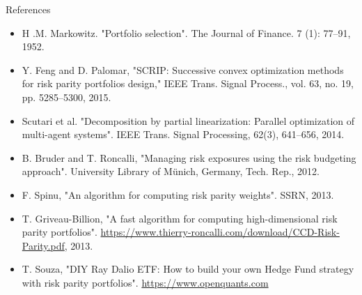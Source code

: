 \documentclass[aspectratio=169]{beamer}
\begin{document}
\begin{frame}{References}
  \vspace{.5cm}
  \begin{itemize}
    \item {\footnotesize H .M. Markowitz. "Portfolio selection". The Journal of Finance. 7 (1): 77–91, 1952.}
    \item {\footnotesize Y. Feng and D. Palomar, "SCRIP: Successive convex optimization methods for risk parity portfolios design,"
           IEEE Trans. Signal Process., vol. 63, no. 19, pp. 5285–5300, 2015.}
    \item {\footnotesize Scutari et al. "Decomposition by partial linearization: Parallel optimization of multi-agent systems".
           IEEE Trans. Signal Processing, 62(3), 641–656, 2014.}
    \item {\footnotesize B. Bruder and T. Roncalli, "Managing risk exposures using the risk budgeting approach".
           University Library of M\"unich, Germany, Tech. Rep., 2012.}
    \item {\footnotesize F. Spinu, "An algorithm for computing risk parity weights". SSRN, 2013.}
    \item {\footnotesize T. Griveau-Billion, "A fast algorithm for computing high-dimensional risk parity portfolios".
           \url{https://www.thierry-roncalli.com/download/CCD-Risk-Parity.pdf}, 2013.}
    \item {\footnotesize T. Souza, "DIY Ray Dalio ETF: How to build your own Hedge Fund strategy with risk parity portfolios".
           \url{https://www.openquants.com}}
  \end{itemize}
\end{frame}
\end{document}
